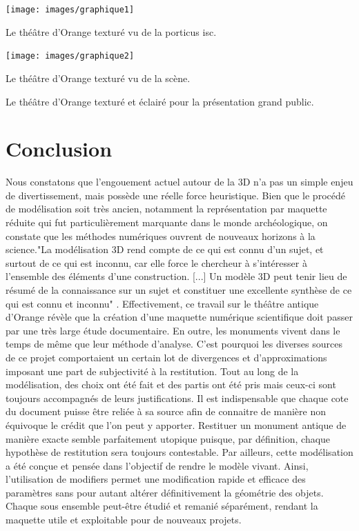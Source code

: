  \begin{figureth}
	\begin{subfigureth}{\textwidth}
		\texttt{[image: images/graphique1]}
	\caption{Le théâtre d'Orange texturé vu de la \gls{porticus isc}.} 
	\end{subfigureth}	
	\begin{subfigureth}{\textwidth}
		\texttt{[image: images/graphique2]}
		\caption{Le théâtre d'Orange texturé vu de la scène.} 		
	\end{subfigureth}	
	\caption{Le théâtre d'Orange texturé et éclairé pour la présentation grand public.}
	\label{theatretexture}
\end{figureth}


		
		
\chapter*{Conclusion}

Nous constatons que l'engouement actuel autour de la 3D n'a pas un simple enjeu de divertissement, mais possède une réelle force heuristique. Bien que le procédé de modélisation soit très ancien, notamment la représentation par maquette réduite qui fut particulièrement marquante dans le monde archéologique, on constate que les méthodes numériques ouvrent de nouveaux horizons à la science."La modélisation 3D rend compte de ce qui est connu d’un sujet, et surtout de ce qui est inconnu, car elle force le chercheur à s’intéresser à l’ensemble des éléments d’une construction. [...] Un modèle 3D peut tenir lieu de résumé de la connaissance sur un sujet et constituer une excellente synthèse de ce qui est connu et inconnu" \cite[p. 249]{rocheleau}. Effectivement, ce travail sur le théâtre antique d'Orange révèle que la création d'une maquette numérique scientifique doit passer par une très large étude documentaire. En outre, les monuments vivent dans le temps de même que leur méthode d'analyse. C'est pourquoi les diverses sources de ce projet comportaient un certain lot de divergences et d'approximations imposant une part de subjectivité à la restitution. Tout au long de la modélisation, des choix ont été fait et des partis ont été pris mais ceux-ci sont toujours accompagnés de leurs justifications. Il est indispensable que chaque cote du document puisse être reliée à sa source afin de connaitre de manière non équivoque le crédit que l'on peut y apporter. Restituer un monument antique de manière exacte semble parfaitement utopique puisque, par définition, chaque hypothèse de restitution sera toujours contestable.
Par ailleurs, cette modélisation a été conçue et pensée dans l'objectif de rendre le modèle vivant. Ainsi, l'utilisation de \glspl{modifier} permet une modification rapide et efficace des paramètres sans pour autant altérer définitivement la géométrie des objets. Chaque sous ensemble peut-être étudié et remanié séparément, rendant la maquette utile et exploitable pour de nouveaux projets.

